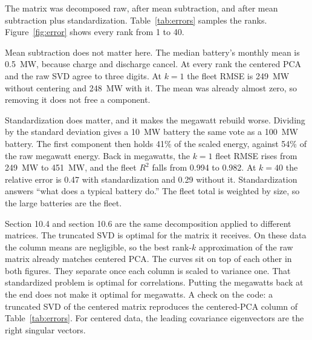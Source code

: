 \documentclass[12pt]{article}
\begin{document}
The matrix was decomposed raw, after mean subtraction, and after mean subtraction plus standardization.
Table~\ref{tab:errors} samples the ranks.
Figure~\ref{fig:error} shows every rank from 1 to 40.

\begin{table}[H]
\centering
\singlespacing
\caption{Share of energy in the decomposed matrix, and relative error after the result is returned to megawatts.}
\label{tab:errors}
\small
{}
\end{table}

Mean subtraction does not matter here.
The median battery's monthly mean is 0.5~MW, because charge and discharge cancel.
At every rank the centered PCA and the raw SVD agree to three digits.
At $k = 1$ the fleet RMSE is 249~MW without centering and 248~MW with it.
The mean was already almost zero, so removing it does not free a component.

Standardization does matter, and it makes the megawatt rebuild worse.
Dividing by the standard deviation gives a 10~MW battery the same vote as a 100~MW battery.
The first component then holds 41\% of the scaled energy, against 54\% of the raw megawatt energy.
Back in megawatts, the $k = 1$ fleet RMSE rises from 249~MW to 451~MW, and the fleet $R^{2}$ falls from 0.994 to 0.982.
At $k = 40$ the relative error is 0.47 with standardization and 0.29 without it.
Standardization answers ``what does a typical battery do.''
The fleet total is weighted by size, so the large batteries are the fleet.

Section 10.4 and section 10.6 are the same decomposition applied to different matrices.
The truncated SVD is optimal for the matrix it receives.
On these data the column means are negligible, so the best rank-$k$ approximation of the raw matrix already matches centered PCA.
The curves sit on top of each other in both figures.
They separate once each column is scaled to variance one.
That standardized problem is optimal for correlations.
Putting the megawatts back at the end does not make it optimal for megawatts.
A check on the code: a truncated SVD of the centered matrix reproduces the centered-PCA column of Table~\ref{tab:errors}.
For centered data, the leading covariance eigenvectors are the right singular vectors.
\end{document}
